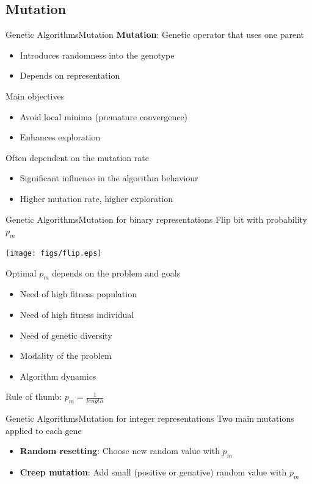 \documentclass[10pt,compress]{beamer} %
\begin{document}
\subsection{Mutation}
\begin{frame}{Genetic Algorithms}{Mutation}
	\textbf{Mutation}: Genetic operator that uses one parent
	\begin{itemize}
		\item Introduces randomness into the genotype
		\item Depends on representation
  	\end{itemize}
	Main objectives
	\begin{itemize}
		\item Avoid local minima (premature convergence)
		\item Enhances exploration
	\end{itemize}
	Often dependent on the \alert{mutation rate}
	\begin{itemize}
		\item Significant influence in the algorithm behaviour
		\item Higher mutation rate, higher exploration
	\end{itemize}
\end{frame}

\begin{frame}{Genetic Algorithms}{Mutation for binary representations}
	Flip bit with probability $p_m$
	\vspace{-0.7cm}
	\begin{center}
	\texttt{[image: figs/flip.eps]}
	\end{center}
	\vspace{-0.7cm}
	Optimal $p_m$ depends on the problem and goals
	\begin{itemize}
		\item Need of high fitness population
		\item Need of high fitness individual
		\item Need of genetic diversity
		\item Modality of the problem
		\item Algorithm dynamics
  	\end{itemize}
	Rule of thumb: $p_m = \frac{1}{length}$
\end{frame}

\begin{frame}{Genetic Algorithms}{Mutation for integer representations}
	Two main mutations applied to each gene
	\begin{itemize}
		\item \textbf{Random resetting}: Choose new random value with $p_m$
		\item \textbf{Creep mutation}: Add small (positive or genative) random value with $p_m$
	\end{itemize}
\end{frame}
\end{document}
